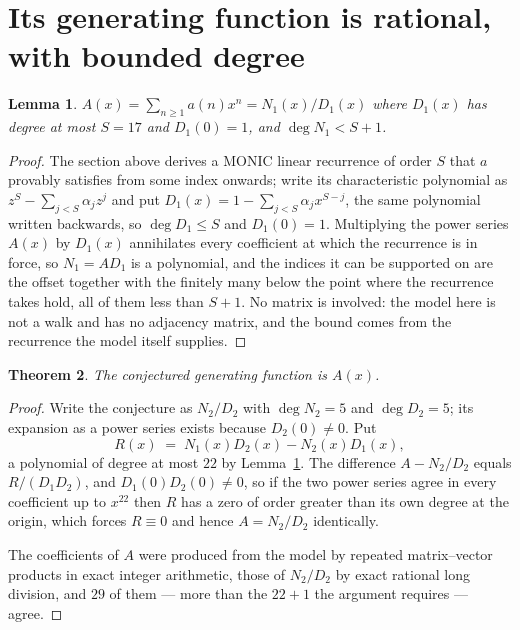 \documentclass[11pt,a4paper]{article}
\theoremstyle{plain}
\newtheorem{theorem}{Theorem}
\newtheorem{lemma}[theorem]{Lemma}
\theoremstyle{definition}
\begin{document}
\section{Its generating function is rational, with bounded degree}

\begin{lemma}\label{lem:rat}
$A(x)=\sum_{n\ge1}a(n)x^n=N_1(x)/D_1(x)$ where $D_1(x)$ has degree at most $S=17$ and
$D_1(0)=1$, and $\deg N_1<S+1$.
\end{lemma}

\begin{proof}
The section above derives a MONIC linear recurrence of order $S$ that $a$ provably satisfies
from some index onwards; write its characteristic polynomial as $z^S-\sum_{j<S}\alpha_jz^j$
and put $D_1(x)=1-\sum_{j<S}\alpha_jx^{S-j}$, the same polynomial written backwards, so
$\deg D_1\le S$ and $D_1(0)=1$. Multiplying the power series $A(x)$ by $D_1(x)$ annihilates
every coefficient at which the recurrence is in force, so $N_1=AD_1$ is a polynomial, and the
indices it can be supported on are the offset together with the finitely many below the point
where the recurrence takes hold, all of them less than $S+1$. No matrix is involved: the
model here is not a walk and has no adjacency matrix, and the bound comes from the recurrence
the model itself supplies.
\end{proof}

\begin{theorem}
The conjectured generating function is $A(x)$.
\end{theorem}

\begin{proof}
Write the conjecture as $N_2/D_2$ with $\deg N_2=5$ and $\deg D_2=5$; its expansion as a
power series exists because $D_2(0)\neq0$. Put
\[
R(x)\;=\;N_1(x)D_2(x)-N_2(x)D_1(x),
\]
a polynomial of degree at most $22$ by Lemma~\ref{lem:rat}. The difference
$A-N_2/D_2$ equals $R/(D_1D_2)$, and $D_1(0)D_2(0)\neq0$, so if the two power series agree in
every coefficient up to $x^{22}$ then $R$ has a zero of order greater than its own
degree at the origin, which forces $R\equiv0$ and hence $A=N_2/D_2$ identically.

The coefficients of $A$ were produced from the model by repeated matrix--vector products in
exact integer arithmetic, those of $N_2/D_2$ by exact rational long division, and $29$
of them --- more than the $22+1$ the argument requires --- agree.
\end{proof}
\end{document}
